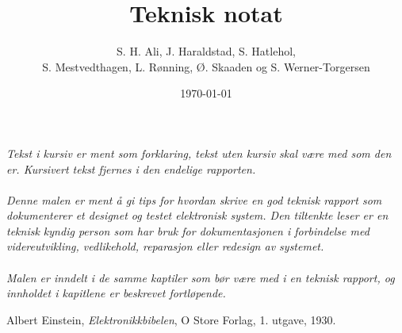 \documentclass[11pt,norsk]{elsys-teknisk}
\title{Teknisk notat}
\author{S. H. Ali, J. Haraldstad, S. Hatlehol, \\ S. Mestvedthagen, L. Rønning, Ø. Skaaden og S. Werner-Torgersen}
\date{\today}
\begin{document}
\maketitle


\toc


\textit{Tekst i kursiv er ment som forklaring, tekst uten kursiv skal være med som den er. Kursivert tekst fjernes i den endelige rapporten.\\
\\
Denne malen er ment å gi tips for hvordan skrive en god teknisk rapport som dokumenterer et designet og testet elektronisk system. Den tiltenkte leser er en teknisk kyndig person som har bruk for dokumentasjonen i forbindelse med videreutvikling, vedlikehold, reparasjon eller redesign av systemet.\\
\\
Malen er inndelt i de samme kaptiler som bør være med i en teknisk rapport, og innholdet i kapitlene er beskrevet fortløpende.
}

\jolyu

\newpage



\newpage



\newpage



\newpage



\newpage



\newpage




{}
\begin{thebibliography}{99}

  Albert Einstein,
  \emph{Elektronikkbibelen},
  O Store Forlag,
  1. utgave,
  1930.

\end{thebibliography}


\appendix

\end{document}
